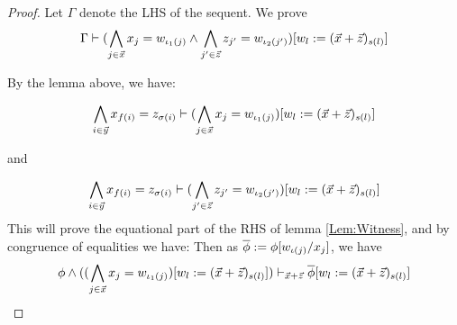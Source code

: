 \begin{proof}
  Let $\Gamma$ denote the LHS of the sequent. We prove 
  \begin{equation*}
    \Gamma \vdash (\bigwedge_{j\in\vec{x}}x_j = w_{\iota_1(j)}\land \bigwedge_{j'\in\vec{z}}z_{j'}= w_{\iota_2(j')}) [w_l:=(\vec{x}+\vec{z})_{s(l)}] 
  \end{equation*}

  By the lemma above, we have:
  
  \begin{equation*}
   \bigwedge_{i\in \vec{y}} x_{f(i)} = z_{\sigma(i)} \vdash 
    (\bigwedge_{j\in\vec{x}}x_j = w_{\iota_1(j)}) [w_l:=(\vec{x}+\vec{z})_{s(l)}] 
  \end{equation*}

  and 

  \begin{equation*}
    \bigwedge_{i\in \vec{y}} x_{f(i)} = z_{\sigma(i)} \vdash 
    (\bigwedge_{j'\in\vec{z}}z_{j'}= w_{\iota_2(j')}) [w_l:=(\vec{x}+\vec{z})_{s(l)}] 
  \end{equation*}
  This will prove the equational part of the RHS of lemma \ref{Lem:Witness}, and by congruence of equalities we have:
  Then as $\overline{\phi} := \phi[w_{\iota(j)}/x_j]$, we have 
  \begin{equation*}
    \phi\land ((\bigwedge_{j\in\vec{x}}x_j = w_{\iota_1(j)})[w_l:=(\vec{x}+\vec{z})_{s(l)}])  \vdash_{\vec{x} + \vec{z}} \overline{\phi} [w_l:=(\vec{x}+\vec{z})_{s(l)}] 
  \end{equation*}

  

  



\end{proof}

